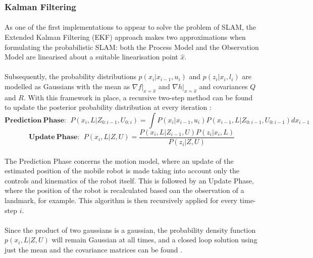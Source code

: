 \documentclass[11pt]{article}
\begin{document}
	\subsubsection{Kalman Filtering}
	\paragraph{}
	As one of the first implementations to appear to solve the problem of SLAM, the Extended Kalman Filtering (EKF) approach makes two approximations when formulating the probabilistic SLAM: both the Process Model and the Observation Model are linearised about a suitable linearisation point $\hat{x}$.

	\paragraph{}
	 Subsequently, the probability distributions $p(x_i|x_{i-1}, u_i)$ and $p(z_i|x_i, l_i)$ are modelled as Gaussians with the mean as $\nabla f|_{x=\hat{x}}$ and $\nabla h|_{x=\hat{x}}$ and covariances $Q$ and $R$. With this framework in place, a recursive two-step method can be found to update the posterior probability distribution at every iteration \cite{SLAMPartI}:
		\begin{equation*}
		\mathbf{Prediction\ Phase:}\ \ 
		P(x_{i},L|Z_{0:i-1}, U_{0:i}) = \int P(x_i | x_{i-1}, u_{i}) P(x_{i-1}, L |Z_{0:i-1}, U_{0:i-1})dx_{i-1}
		\end{equation*}
		\begin{equation*}
		\mathbf{Update\ Phase:} \ \  P(x_i, L | Z, U) = \frac{P(x_{i}, L | Z_{i-1}, U)P(z_i|x_i,L)}{P(z_i|Z, U)}
		\end{equation*}	 	
	\paragraph{}
	The Prediction Phase concerns the motion model, where an update of the estimated position of the mobile robot is made taking into account only the controls and kinematics of the robot itself. This is followed by an Update Phase, where the position of the robot is recalculated based oan the observation of a landmark, for example. This algorithm is then recursively applied for every time-step $i$. 	
	\paragraph{}	 
	 Since the product of two gaussians is a gaussian, the probability density function $p(x_i, L|Z, U)$ will remain Gaussian at all times, and a closed loop solution using just the mean and the covariance matrices can be found \cite{772544}.
\end{document}
